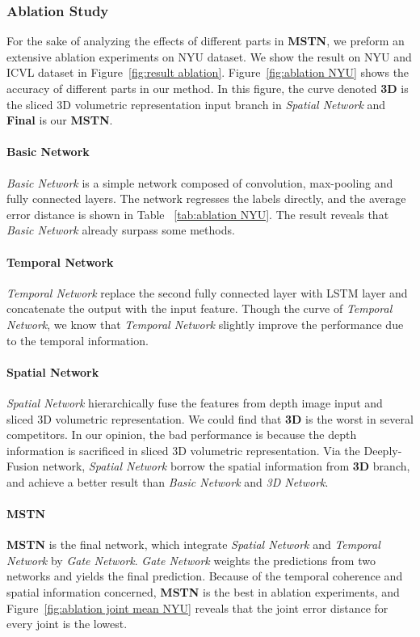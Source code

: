 \documentclass[journal,comsoc]{IEEEtran}
\begin{document}
\subsubsection{Ablation Study}\label{sec:ablation}
For the sake of analyzing the effects of different parts in \textbf{MSTN}, we preform an extensive ablation
experiments on NYU dataset. We show the result on NYU and ICVL dataset in Figure~\ref{fig:result ablation}.
Figure~\ref{fig:ablation NYU} shows the accuracy of different parts in our method. In this figure, the curve denoted
\textbf{3D} is the sliced 3D volumetric representation input branch in \emph{Spatial Network} and \textbf{Final}
is our \textbf{MSTN}.

\paragraph{Basic Network} \emph{Basic Network} is a simple network composed of convolution, max-pooling and fully 
connected layers. The network regresses the labels directly, and the average error distance is shown in Table
~\ref{tab:ablation NYU}. The result reveals that \emph{Basic Network} already surpass some methods.

\paragraph{Temporal Network} \emph{Temporal Network} replace the second fully connected layer with LSTM layer and
concatenate the output with the input feature. Though the curve of \emph{Temporal Network}, we know that
\emph{Temporal Network} slightly improve the performance due to the temporal information.

\paragraph{Spatial Network} \emph{Spatial Network} hierarchically fuse the features from depth image input and
sliced 3D volumetric representation. We could find that \textbf{3D} is the worst in several competitors. In our
opinion, the bad performance is because the depth information is sacrificed in sliced 3D volumetric representation.
Via the Deeply-Fusion network, \emph{Spatial Network} borrow the spatial information from \textbf{3D} branch, and
achieve a better result than \emph{Basic Network} and \emph{3D Network}.

\paragraph{MSTN} \textbf{MSTN} is the final network, which integrate \emph{Spatial Network} and \emph{Temporal Network}
by \emph{Gate Network}. \emph{Gate Network} weights the predictions from two networks and yields the final prediction.
Because of the temporal coherence and spatial information concerned, \textbf{MSTN} is the best in ablation experiments,
and Figure~\ref{fig:ablation joint mean NYU} reveals that the joint error distance for every joint is the lowest.
\end{document}

